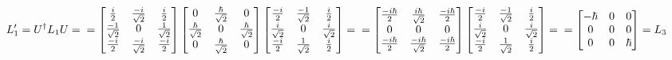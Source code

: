 \begin{equation}
  L_1' = U^\dagger L_1 U =
  \\

  \\
  = \left[\begin{matrix}
    \frac{i}{2} & \frac{-i}{\sqrt{2}} & \frac{i}{2}\\
    \frac{-1}{\sqrt{2}} & 0 & \frac{1}{\sqrt{2}}\\
    \frac{-i}{2} & \frac{-i}{\sqrt{2}} & \frac{-i}{2}
  \end{matrix}\right]
  \left[\begin{matrix}
    0 & \frac{\hbar}{\sqrt{2}} & 0\\
    \frac{\hbar}{\sqrt{2}} & 0 & \frac{\hbar}{\sqrt{2}}\\
    0 & \frac{\hbar}{\sqrt{2}} & 0
  \end{matrix}\right]
  \left[\begin{matrix}
    \frac{-i}{2} & \frac{-1}{\sqrt{2}} & \frac{i}{2}\\
    \frac{i}{\sqrt{2}} & 0 & \frac{i}{\sqrt{2}}\\
    \frac{-i}{2} & \frac{1}{\sqrt{2}} & \frac{i}{2}
  \end{matrix}\right] =
  \\

  \\
  = \left[\begin{matrix}
    \frac{-i\hbar}{2} & \frac{i\hbar}{\sqrt{2}} & \frac{-i\hbar}{2}\\
    0 & 0 & 0\\
    \frac{-i\hbar}{2} & \frac{-i\hbar}{\sqrt{2}} & \frac{-i\hbar}{2}
  \end{matrix}\right]\left[
    \begin{matrix}
    \frac{-i}{2} & \frac{-1}{\sqrt{2}} & \frac{i}{2}\\
    \frac{i}{\sqrt{2}} & 0 & \frac{i}{\sqrt{2}}\\
    \frac{-i}{2} & \frac{1}{\sqrt{2}} & \frac{i}{2}
    \end{matrix}
  \right] =
  \\

  \\
  =\left[\begin{matrix}
  -\hbar & 0 & 0\\
  0 & 0 & 0\\
  0 & 0 & \hbar\\
  \end{matrix}\right] = L_3
\end{equation}

